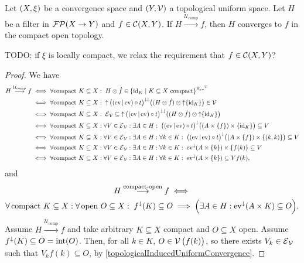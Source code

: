 \begin{proposition} \label{uniformConvergenceOnCompactsImpliesCompactOpenConvergence}
Let $\sSet{X, \xi}$ be a convergence space and $\sSet{Y, \mathcal{V}}$ a topological uniform space. Let $H$ be a filter in $\operatorname{\mathcal{FP}}(X\to Y)$ and $f\in \operatorname{\mathcal{C}}(X, Y)$. 
If $H \overset{\mathcal{U}_\text{comp}}{\longrightarrow} f$, then $H$ converges to $f$ in the compact open topology.
\end{proposition}
TODO: if $\xi$ is locally compact, we relax the requirement that $f\in \operatorname{\mathcal{C}}(X,Y)$?
\begin{proof}
We have
\begin{align*}
H \overset{\mathcal{U}_\text{comp}}{\longrightarrow} f &\iff \forall \text{compact $K\subseteq X$}:\; H\otimes \pfilter{f} \in \setbuilder{\id_K}{\text{$K\subseteq X$ compact}}^{\uRelEv^\transp} \\
&\iff \forall \text{compact $K\subseteq X$}:\; \upset\big((\evalMap | \evalMap)\circ t\big)^{\imf\imf}\big((H\otimes\pfilter{f})\otimes \upset\{\id_K\}\big) \in \mathcal{V} \\
&\iff \forall \text{compact $K\subseteq X$}:\; \entourage_\mathcal{V} \subseteq \upset\big((\evalMap | \evalMap)\circ t\big)^{\imf\imf}\big((H\otimes\pfilter{f})\otimes \upset\{\id_K\}\big) \\
&\iff \forall \text{compact $K\subseteq X$}: \forall V\in \entourage_{\mathcal{V}}: \exists A\in H: \; \big((\evalMap | \evalMap)\circ t\big)^{\imf}\big((A\times\{f\})\times \{\id_K\}\big) \subseteq V \\
&\iff \forall \text{compact $K\subseteq X$}: \forall V\in \entourage_{\mathcal{V}}: \exists A\in H: \forall k\in K: \; \big((\evalMap | \evalMap)\circ t\big)^{\imf}\big((A\times\{f\})\times \{(k,k)\}\big) \subseteq V \\
&\iff \forall \text{compact $K\subseteq X$}: \forall V\in \entourage_{\mathcal{V}}: \exists A\in H: \forall k\in K: \; \evalMap^\imf(A\times \{k\})\times \{f(k)\} \subseteq V \\
&\iff \forall \text{compact $K\subseteq X$}: \forall V\in \entourage_{\mathcal{V}}: \exists A\in H: \forall k\in K: \; \evalMap^\imf(A\times \{k\}) \subseteq Vf(k),
\end{align*}
and
\begin{multline*}
H \overset{\text{compact-open}}{\longrightarrow} f \iff \\
\forall \,\text{compact $K\subseteq X$}: \forall \,\text{open $O\subseteq X$}: \; f^\downarrow(K)\subseteq O \implies \Big(\exists A\in H: \operatorname{ev}^\downarrow(A\times K)\subseteq O\Big).
\end{multline*}
Assume $H \overset{\mathcal{U}_\text{comp}}{\longrightarrow} f$ and take arbitrary $K\subseteq X$ compact and $O\subseteq X$ open. Assume $f^\downarrow(K)\subseteq O = \operatorname{int}(O)$. Then, for all $k\in K$, $O\in \operatorname{\mathcal{V}}\big(f(k)\big)$, so there exists $V_k\in\operatorname{\mathcal{E}}_{\mathcal{V}}$ such that $V_kf(k)\subseteq O$, by \ref{topologicalInducedUniformConvergence}.


\end{proof}
